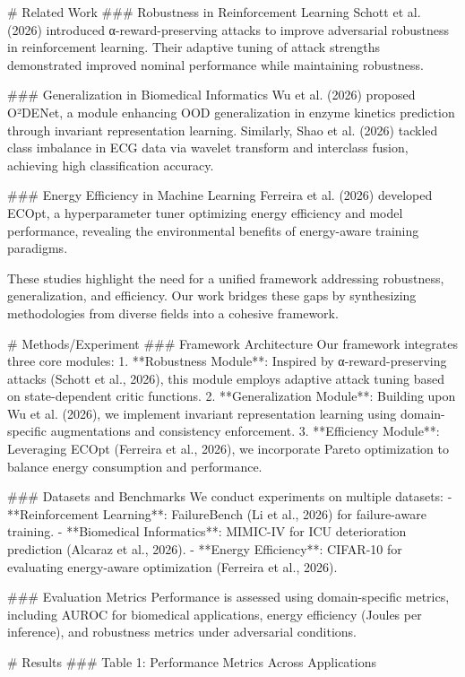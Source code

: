 # Related Work  
### Robustness in Reinforcement Learning  
Schott et al. (2026) introduced α-reward-preserving attacks to improve adversarial robustness in reinforcement learning. Their adaptive tuning of attack strengths demonstrated improved nominal performance while maintaining robustness.  

### Generalization in Biomedical Informatics  
Wu et al. (2026) proposed O²DENet, a module enhancing OOD generalization in enzyme kinetics prediction through invariant representation learning. Similarly, Shao et al. (2026) tackled class imbalance in ECG data via wavelet transform and interclass fusion, achieving high classification accuracy.  

### Energy Efficiency in Machine Learning  
Ferreira et al. (2026) developed ECOpt, a hyperparameter tuner optimizing energy efficiency and model performance, revealing the environmental benefits of energy-aware training paradigms.  

These studies highlight the need for a unified framework addressing robustness, generalization, and efficiency. Our work bridges these gaps by synthesizing methodologies from diverse fields into a cohesive framework.  

# Methods/Experiment  
### Framework Architecture  
Our framework integrates three core modules:  
1. **Robustness Module**: Inspired by α-reward-preserving attacks (Schott et al., 2026), this module employs adaptive attack tuning based on state-dependent critic functions.  
2. **Generalization Module**: Building upon Wu et al. (2026), we implement invariant representation learning using domain-specific augmentations and consistency enforcement.  
3. **Efficiency Module**: Leveraging ECOpt (Ferreira et al., 2026), we incorporate Pareto optimization to balance energy consumption and performance.  

### Datasets and Benchmarks  
We conduct experiments on multiple datasets:  
- **Reinforcement Learning**: FailureBench (Li et al., 2026) for failure-aware training.  
- **Biomedical Informatics**: MIMIC-IV for ICU deterioration prediction (Alcaraz et al., 2026).  
- **Energy Efficiency**: CIFAR-10 for evaluating energy-aware optimization (Ferreira et al., 2026).  

### Evaluation Metrics  
Performance is assessed using domain-specific metrics, including AUROC for biomedical applications, energy efficiency (Joules per inference), and robustness metrics under adversarial conditions.  

# Results  
### Table 1: Performance Metrics Across Applications  

